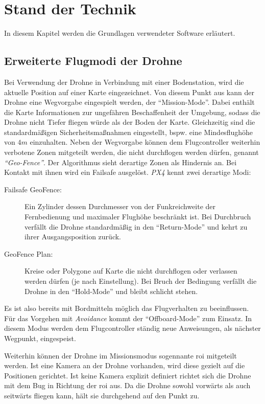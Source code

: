 \chapter{Stand der Technik}
In diesem Kapitel werden die Grundlagen verwendeter Software erläutert.
\section{Erweiterte Flugmodi der Drohne}\label{chap:intro_capabilities}
Bei Verwendung der Drohne in Verbindung mit einer Bodenstation, wird die aktuelle Position auf einer Karte eingezeichnet. Von diesem Punkt aus kann der Drohne eine Wegvorgabe eingespielt werden, der \enquote{Mission-Mode}. Dabei enthält die Karte Informationen zur ungefähren Beschaffenheit der Umgebung, sodass die Drohne nicht Tiefer fliegen würde als der Boden der Karte. Gleichzeitig sind die standardmäßigen Sicherheitsmaßnahmen eingestellt, bspw. eine Mindesflughöhe von $4m$ einzuhalten. Neben der Wegvorgabe können dem Flugcontroller weiterhin verbotene Zonen mitgeteilt werden, die nicht durchflogen werden dürfen, genannt \textit{\enquote{Geo-Fence}}. Der Algorithmus sieht derartige Zonen als Hindernis an. Bei Kontakt mit ihnen wird ein Failsafe ausgelöst. \textit{PX4} kennt zwei derartige Modi:
\begin{description}
    \item[Failsafe GeoFence:] Ein Zylinder dessen Durchmesser von der Funkreichweite der Fernbedienung und maximaler Flughöhe beschränkt ist. Bei Durchbruch verfällt die Drohne standardmäßig in den \enquote{Return-Mode} und kehrt zu ihrer Ausgangsposition zurück.
    \item[GeoFence Plan:] Kreise oder Polygone auf Karte die nicht durchflogen oder verlassen werden dürfen (je nach Einstellung). Bei Bruch der Bedingung verfällt die Drohne in den \enquote{Hold-Mode} und bleibt schlicht stehen.
\end{description}

Es ist also bereits mit Bordmitteln möglich das Flugverhalten zu beeinflussen. Für das Vorgehen mit \textit{Avoidance} kommt der \enquote{Offboard-Mode} zum Einsatz. In diesem Modus werden dem Flugcontroller ständig neue Anweisungen, als nächster Wegpunkt, eingespeist.

Weiterhin können der Drohne im Missionsmodus sogennante \gls{roi} mitgeteilt werden. Ist eine Kamera an der Drohne vorhanden, wird diese gezielt auf die Positionen gerichtet. Ist keine Kamera explizit definiert richtet sich die Drohne mit dem Bug in Richtung der \gls{roi} aus. Da die Drohne sowohl vorwärts als auch seitwärts fliegen kann, hält sie durchgehend auf den Punkt zu.

